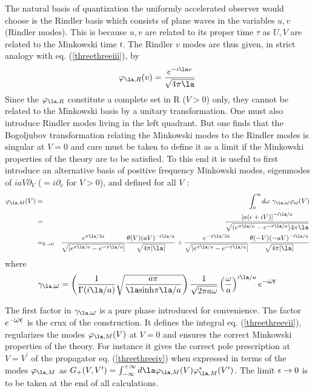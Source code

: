 The natural basis of quantization the uniformly accelerated observer would
choose  is the Rindler basis which consists of plane waves in the variables
$u,v$ (Rindler modes). This is because $u, v$ are related to its proper time
$\tau$ as $U, V$
are
related to the Minkowski time $t$. The Rindler $v$ modes are thus
given, in strict analogy with eq. (\ref{threethreeiii}), by
\begin{equation} \varphi_{\la, R} (v) = {e^{-i\la v} \over \sqrt{4 \pi \la}}
\label{threethreeiiiv}
\end{equation}
Since the $\varphi_{\la, R}$ constitute a complete set in R ($V>0$)
only, they cannot be related to the Minkowski basis by a unitary
transformation.
One must also introduce Rindler modes living in the left quadrant.
But one finds that the Bogoljubov transformation relating the
  Minkowski
modes to the Rindler modes is singular  at $V=0$ \cite{tmunu}
 and care must be
taken to define it as a limit if the Minkowski properties of the theory are
to be satisfied.
To this end it is useful to first introduce an alternative basis
of positive frequency Minkowski modes,
eigenmodes of $iaV\partial_V$ ($=i\partial_v$ for $V>0$),
and defined for all $V$
\cite{Unruh}:
\begin{eqnarray}  \varphi_{\la,M}(V) &=& \int_0^{\infty}\! d\omega\
\gamma_{\la,\om} \varphi_{\om}(V) \nonumber\\ &=& {\left[ a(\e +
iV)\right]^{-i \la /a} \over  \sqrt{ ( e^{\pi \la /a} - e^{-\pi \la /a})4 \pi
\la}}\nonumber\\  &=_{\e\rightarrow 0}&
{e^{\pi \la/2a}\over  \sqrt{\vert e^{\pi \la /a} -
e^{-\pi \la /a}\vert}} { \theta(V)(aV)^{-i \la /a}
\over \sqrt{4 \pi \vert \la\vert}} +
{e^{-\pi \la/2a}\over \sqrt{\vert e^{\pi \la /a} - e^{-\pi \la /a}\vert}}
{\theta(-V) (-aV )^{-i \la /a} \over \sqrt{ 4 \pi \vert \la\vert}}
\nonumber\\
\label{threethreevii} \end{eqnarray}
where \begin{equation}  \gamma_{\la,\om}=
\left({1\over \Gamma({i\la/ a})}  \sqrt{a \pi \over {\la }
\mbox{sinh}{\pi \la /a} }\right) {1 \over \sqrt{2 \pi a \om}} \left(
{\om \over
a } \right)^{i\la/ a} e^{-\om \e} \label{threethreeviii} \end{equation}

The first factor in $\gamma_{\la,\om}$ is a pure phase introduced for
convenience. The factor $ e^{-\mbox{$ \omega $} \mbox{$ \epsilon $}}$ is the crux of the construction.
It
defines the integral eq. (\ref{threethreevii}), regularizes the modes
$\varphi_{\la,M}(V)$ at $V=0$  and ensures the correct
Minkowski
properties of the theory. For instance it gives the correct pole
prescription
at $V=V^\prime$ of the propagator eq. (\ref{threethreeiv}) when expressed in
terms
of the modes $\varphi_{\la,M}$ as $G_+(V,V^\prime) = \int_{-\infty}^{+
\infty}
d \la   \varphi_{\la,M}(V)\varphi_{\la,M}^*(V^\prime)$. The limit $\mbox{$ \epsilon $}
\rightarrow 0$ is to be taken at the end of all calculations.

